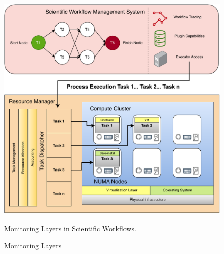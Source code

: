 \begin{figure}[H]
    \centering
    \includegraphics[scale=0.5]{fig/02/02-monitoring-layers2.pdf}
    \caption{Monitoring Layers}
    \label{fig:02-monitoring-layers2}
    \tiny
    Monitoring Layers in Scientific Workflows.
\end{figure}

